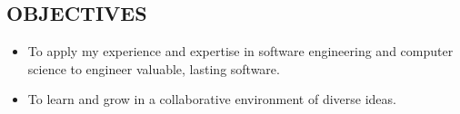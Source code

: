 \documentclass[line,margin]{res}
\begin{document}
\address{wilsoniya@gmail.com}
\address{(312) 404--0425}

\begin{resume}


\section{OBJECTIVES}
    \begin{itemize} \itemsep -2pt
        \item To apply my experience and expertise in software engineering and
            computer science to engineer valuable, lasting software.
        \item To learn and grow in a collaborative environment of diverse
            ideas.
    \end{itemize}



\end{resume}
\end{document}
